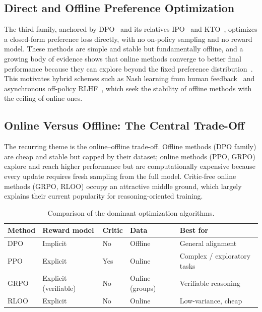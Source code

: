 \subsection{Direct and Offline Preference Optimization}

The third family, anchored by DPO~\cite{rafailov2023dpo} and its
relatives IPO~\cite{azar2024ipo} and KTO~\cite{ethayarajh2024kto},
optimizes a closed-form preference loss directly, with no on-policy
sampling and no reward model. These methods are simple and stable but
fundamentally offline, and a growing body of evidence shows that online
methods converge to better final performance because they can explore
beyond the fixed preference
distribution~\cite{tajwar2024preference,xu2024dpoppo}. This motivates
hybrid schemes such as Nash learning from human
feedback~\cite{munos2023nash} and asynchronous off-policy
RLHF~\cite{noukhovitch2025async}, which seek the stability of offline
methods with the ceiling of online ones.

\subsection{Online Versus Offline: The Central Trade-Off}

The recurring theme is the online--offline trade-off. Offline methods
(DPO family) are cheap and stable but capped by their dataset; online
methods (PPO, GRPO) explore and reach higher performance but are
computationally expensive because every update requires fresh sampling
from the full model. Critic-free online methods (GRPO, RLOO) occupy an
attractive middle ground, which largely explains their current
popularity for reasoning-oriented training.

\begin{table}[t]
\centering
\caption{Comparison of the dominant optimization algorithms.}
\label{tab:algos}
\renewcommand{\arraystretch}{1.25}
\footnotesize
\begin{tabular}{@{}p{}p{}p{}p{}p{}@{}}
\toprule
\textbf{Method} & \textbf{Reward model} & \textbf{Critic} & \textbf{Data} & \textbf{Best for} \\
\midrule
DPO  & Implicit & No  & Offline & General alignment \\
PPO  & Explicit & Yes & Online  & Complex / exploratory tasks \\
GRPO & Explicit (verifiable) & No & Online (groups) & Verifiable reasoning \\
RLOO & Explicit & No & Online & Low-variance, cheap \\
\bottomrule
\end{tabular}
\end{table}
